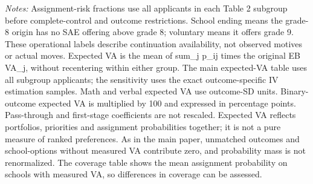 \begin{table}[!htbp]
\centering
\caption{Expected value added by applicant continuation group}
\label{tab:expected-va-by-continuation}
\par\medskip\footnotesize
\begin{minipage}{\textwidth}
\textit{Notes:} Assignment-risk fractions use all applicants in each Table 2 subgroup before complete-control and outcome restrictions. School ending means the grade-8 origin has no SAE offering above grade 8; voluntary means it offers grade 9. These operational labels describe continuation availability, not observed motives or actual moves. Expected VA is the mean of sum_j p_ij times the original EB VA_j, without recentering within either group. The main expected-VA table uses all subgroup applicants; the sensitivity uses the exact outcome-specific IV estimation samples. Math and verbal expected VA use outcome-SD units. Binary-outcome expected VA is multiplied by 100 and expressed in percentage points. Pass-through and first-stage coefficients are not rescaled. Expected VA reflects portfolios, priorities and assignment probabilities together; it is not a pure measure of ranked preferences. As in the main paper, unmatched outcomes and school-options without measured VA contribute zero, and probability mass is not renormalized. The coverage table shows the mean assignment probability on schools with measured VA, so differences in coverage can be assessed.
\end{minipage}
\end{table}
